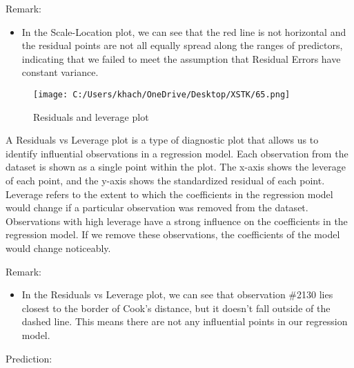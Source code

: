 \documentclass[a4paper]{article}
\begin{document}
	Remark: 
	\begin{itemize}
		\item In the Scale-Location plot, we can see that the red line is not horizontal and the residual points are not all equally spread along the ranges of predictors, indicating that we failed to meet the assumption that Residual Errors have constant variance.
	\end{itemize}
	\begin{figure}[htbp]
		\centering
		\begin{adjustbox}{width=0.7\textwidth, frame}
			\texttt{[image: C:/Users/khach/OneDrive/Desktop/XSTK/65.png]}
		\end{adjustbox}
		\captionsetup{justification=centering}
		\vspace{0.5cm}
		\caption{Residuals and leverage plot}
	\end{figure}
	A Residuals vs Leverage plot is a type of diagnostic plot that allows us to identify influential observations in a regression model. Each observation from the dataset is shown as a single point within the plot. The x-axis shows the leverage of each point, and the y-axis shows the standardized residual of each point. Leverage refers to the extent to which the coefficients in the regression model would change if a particular observation was removed from the dataset. Observations with high leverage have a strong influence on the coefficients in the regression model. If we remove these observations, the coefficients of the model would change noticeably.
	
	Remark: 
	\begin{itemize}
		\item In the Residuals vs Leverage plot, we can see that observation \#2130 lies closest to the border of Cook’s distance, but it doesn’t fall outside of the dashed line. This means there are not any influential points in our regression model.
	\end{itemize}
	Prediction:
	
\end{document}
